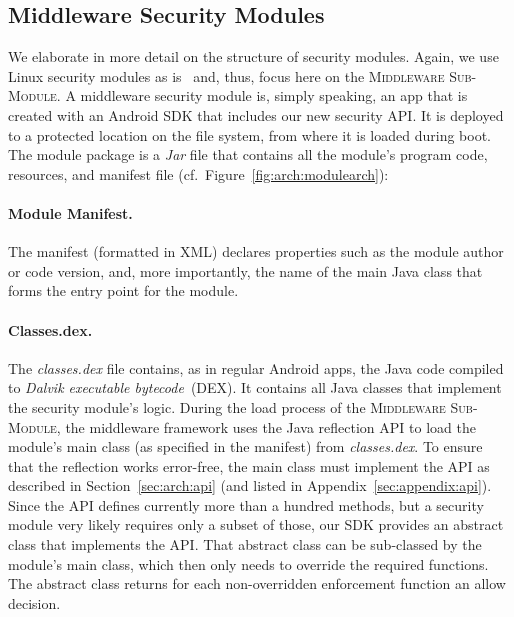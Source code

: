 \documentclass[letterpaper,twocolumn,10pt]{article}
\newcommand{\MMODULE}{\textsc{Middleware Sub-Module}\xspace}
\begin{document}
\subsection{Middleware Security Modules}
\label{sec:arch:modules}

We elaborate in more detail on the structure of security modules. Again, we use Linux security modules as is~\cite{lsmdocu} and, thus, focus here on the \MMODULE. A middleware security module is, simply speaking, an app that is created with an Android SDK that includes our new security API. It is deployed to a protected location on the file system, from where it is loaded during boot. The module package is a \emph{Jar} file that contains all the module's program code, resources, and manifest file (cf.~Figure~\ref{fig:arch:modulearch}):

\paragraph{Module Manifest.} The manifest (formatted in XML) declares properties such as the module author or code version, and, more importantly, the name of the main Java class that forms the entry point for the module.

\paragraph{Classes.dex.} The \textit{classes.dex} file contains, as in regular Android apps, the Java code compiled to \textit{Dalvik executable bytecode}~(DEX). It contains all Java classes that implement the security module's logic. During the load process of the \MMODULE, the middleware framework uses the Java reflection API to load the module's main class (as specified in the manifest) from \textit{classes.dex}. To ensure that the reflection works error-free, the main class must implement the API as described in Section~\ref{sec:arch:api} (and listed in Appendix~\ref{sec:appendix:api}). Since the API defines currently more than a hundred methods, but a security module very likely requires only a subset of those, our SDK provides an abstract class that implements the API. That abstract class can be sub-classed by the module's main class, which then only needs to override the required functions. The abstract class returns for each non-overridden enforcement function an allow decision.
\end{document}
